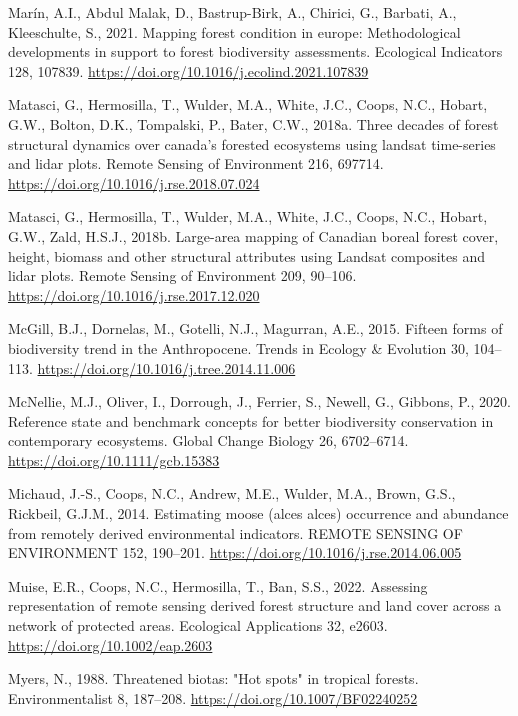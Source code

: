 \documentclass[
]{agujournal2019}
\newlength{\cslhangindent}
\newenvironment{CSLReferences}[2] %
 {\begin{list}{}{%
  \setlength{\itemindent}{0pt}
  \setlength{\leftmargin}{0pt}
  \setlength{\parsep}{0pt}
  \ifodd #1
   \setlength{\leftmargin}{\cslhangindent}
   \setlength{\itemindent}{-1\cslhangindent}
  \fi
  \setlength{\itemsep}{#2\baselineskip}}}
 {\end{list}}
\begin{document}
\begin{CSLReferences}{1}{0}
Marín, A.I., Abdul Malak, D., Bastrup-Birk, A., Chirici, G., Barbati,
A., Kleeschulte, S., 2021. Mapping forest condition in europe:
Methodological developments in support to forest biodiversity
assessments. Ecological Indicators 128, 107839.
\url{https://doi.org/10.1016/j.ecolind.2021.107839}

Matasci, G., Hermosilla, T., Wulder, M.A., White, J.C., Coops, N.C.,
Hobart, G.W., Bolton, D.K., Tompalski, P., Bater, C.W., 2018a. Three
decades of forest structural dynamics over canada's forested ecosystems
using landsat time-series and lidar plots. Remote Sensing of Environment
216, 697714. \url{https://doi.org/10.1016/j.rse.2018.07.024}

Matasci, G., Hermosilla, T., Wulder, M.A., White, J.C., Coops, N.C.,
Hobart, G.W., Zald, H.S.J., 2018b. Large-area mapping of Canadian boreal
forest cover, height, biomass and other structural attributes using
Landsat composites and lidar plots. Remote Sensing of Environment 209,
90--106. \url{https://doi.org/10.1016/j.rse.2017.12.020}

McGill, B.J., Dornelas, M., Gotelli, N.J., Magurran, A.E., 2015. Fifteen
forms of biodiversity trend in the Anthropocene. Trends in Ecology \&
Evolution 30, 104--113. \url{https://doi.org/10.1016/j.tree.2014.11.006}

McNellie, M.J., Oliver, I., Dorrough, J., Ferrier, S., Newell, G.,
Gibbons, P., 2020. Reference state and benchmark concepts for better
biodiversity conservation in contemporary ecosystems. Global Change
Biology 26, 6702--6714. \url{https://doi.org/10.1111/gcb.15383}

Michaud, J.-S., Coops, N.C., Andrew, M.E., Wulder, M.A., Brown, G.S.,
Rickbeil, G.J.M., 2014. Estimating moose (alces alces) occurrence and
abundance from remotely derived environmental indicators. REMOTE SENSING
OF ENVIRONMENT 152, 190--201.
\url{https://doi.org/10.1016/j.rse.2014.06.005}

Muise, E.R., Coops, N.C., Hermosilla, T., Ban, S.S., 2022. Assessing
representation of remote sensing derived forest structure and land cover
across a network of protected areas. Ecological Applications 32, e2603.
\url{https://doi.org/10.1002/eap.2603}

Myers, N., 1988. Threatened biotas: {"}Hot spots{"} in tropical forests.
Environmentalist 8, 187--208. \url{https://doi.org/10.1007/BF02240252}


\end{CSLReferences}
\end{document}
